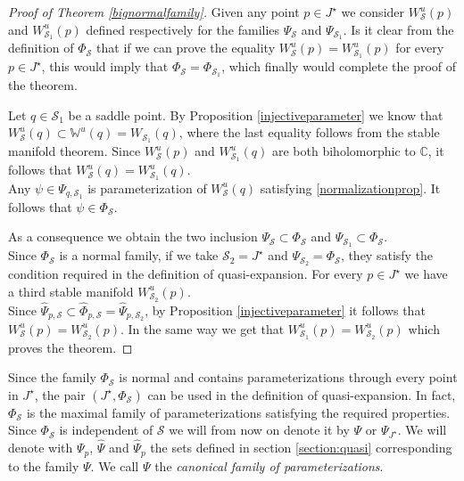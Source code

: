 \documentclass[10pt,a4paper]{article}
\begin{document}
\begin{proof}[Proof of Theorem \ref{bignormalfamily}]
Given any point $p\in J^\star$ we consider $W^u_\mathcal S(p)$ and $W^u_{\mathcal S_1}(p)$ defined respectively for the families $\Psi_{\mathcal S}$ and $\Psi_{\mathcal S_1}$. Is it clear from the definition of $\Phi_\mathcal S$ that if we can prove the equality $W^u_{\mathcal S}(p)=W^u_{\mathcal S_1}(p)$ for every $p\in J^\star$, this would imply that $\Phi_{\mathcal S}=\Phi_{\mathcal S_1}$, which finally would complete the proof of the theorem.

Let $q\in\mathcal S_1$ be a saddle point. By Proposition \ref{injectiveparameter} we know that $W^u_\mathcal S(q)\subset \mathbb W^u(q)=W_{\mathcal S_1}(q)$, where the last equality follows from the stable manifold theorem. Since $W^u_\mathcal S(p)$ and $W_{\mathcal S_1}^u(q)$ are both biholomorphic to $\mathbb C$, it follows that $W^u_{\mathcal S}(q)=W^u_{\mathcal S_1}(q)$.\\
Any $\psi\in\Psi_{q,\mathcal S_1}$ is parameterization of $W^u_\mathcal S(q)$ satisfying \eqref{normalizationprop}. It follows that $\psi\in\Phi_{\mathcal S}$.

As a consequence we obtain the two inclusion $\Psi_{\mathcal S}\subset \Phi_{\mathcal S}$ and $\Psi_{\mathcal S_1}\subset \Phi_{\mathcal S}$.\\
Since $\Phi_{\mathcal S}$ is a normal family, if we take $\mathcal S_2=J^\star$ and $\Psi_{\mathcal S_2}=\Phi_{\mathcal S}$, they satisfy the condition required in the definition of quasi-expansion. For every $p\in J^\star$ we have a third stable manifold $W^u_{\mathcal S_2}(p)$.\\
Since $\widehat{\Psi}_{p,\mathcal S}\subset\widehat\Phi_{p,\mathcal S}=\widehat\Psi_{p,\mathcal S_2}$, by Proposition \ref{injectiveparameter} it follows that $W^u_{\mathcal S}(p)=W^u_{\mathcal S_2}(p)$. In the same way we get that $W^u_{\mathcal S_1}(p)=W^u_{\mathcal S_2}(p)$ which proves the theorem.

\end{proof}
Since the family $\Phi_\mathcal S$ is normal and contains parameterizations through every point in $J^\star$, the pair $(J^\star,\Phi_\mathcal S)$ can be used in the definition of quasi-expansion. In fact, $\Phi_\mathcal S$ is the maximal family of parameterizations satisfying the required properties.\\
Since $\Phi_\mathcal S$ is independent of $\mathcal S$ we will from now on denote it by $\Psi$ or $\Psi_{J^\star}$. We will denote with $\Psi_p$, $\widehat \Psi$ and $\widehat \Psi_p$ the sets defined in section \ref{section:quasi} corresponding to the family $\Psi$. We call $\Psi$ the \emph{canonical family of parameterizations}.
\end{document}

